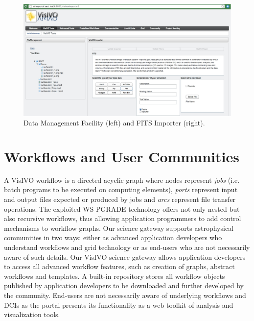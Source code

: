 \documentclass[11pt,twoside]{article}
\begin{document}
\begin{figure}
\begin{center}
\includegraphics[width=1\textwidth]{O08_f1.eps} 
\caption{Data Management Facility (left) and FITS Importer (right).}\label{fg1}
\end{center}
\end{figure}

\section{Workflows and User Communities}
A VisIVO workflow is a directed acyclic graph where nodes represent \emph{jobs} (i.e. batch programs to be executed on computing elements),  \emph{ports} represent input and output files expected or produced by jobs and \emph{arcs} represent file transfer operations. The exploited WS-PGRADE technology offers not only nested but also recursive workflows, thus allowing application programmers to add control mechanisms to workflow graphs. Our science gateway supports astrophysical communities in two ways: either as advanced application developers who understand workflows and grid technology or as end-users who are not necessarily aware of such details. Our VisIVO science gateway allows application developers to access all advanced workflow features, such as creation of graphs, abstract workflows and templates. A built-in repository stores all workflow objects published by application developers to be downloaded and further developed by the community. End-users are not necessarily aware of underlying workflows and DCIs as the portal presents its functionality as a web toolkit of analysis and visualization tools. 
\end{document}
